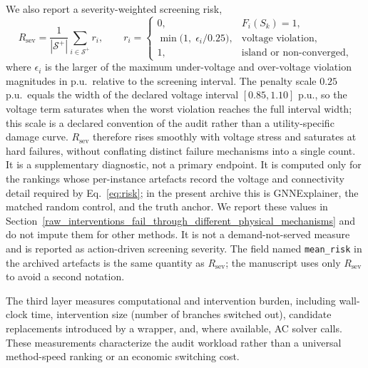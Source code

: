 We also report a severity-weighted screening risk,
\begin{equation}
R_{\mathrm{sev}}=\frac{1}{|\mathcal{S}^{+}|}\sum_{i\in\mathcal{S}^{+}} r_i,\qquad
r_i=\begin{cases}0,&F_i(S_k)=1,\\
\min\!\bigl(1,\;\epsilon_i/0.25\bigr),&\text{voltage violation,}\\
1,&\text{island or non-converged,}\end{cases}
\label{eq:risk}
\end{equation}
where $\epsilon_i$ is the larger of the maximum under-voltage and over-voltage violation magnitudes in p.u.\ relative to the screening interval. The penalty scale $0.25$ p.u.\ equals the width of the declared voltage interval $[0.85, 1.10]$ p.u., so the voltage term saturates when the worst violation reaches the full interval width; this scale is a declared convention of the audit rather than a utility-specific damage curve. $R_{\mathrm{sev}}$ therefore rises smoothly with voltage stress and saturates at hard failures, without conflating distinct failure mechanisms into a single count. It is a supplementary diagnostic, not a primary endpoint. It is computed only for the rankings whose per-instance artefacts record the voltage and connectivity detail required by Eq.~\eqref{eq:risk}; in the present archive this is GNNExplainer, the matched random control, and the truth anchor. We report these values in Section~\ref{raw_interventions_fail_through_different_physical_mechanisms} and do not impute them for other methods. It is not a demand-not-served measure and is reported as action-driven screening severity. The field named \texttt{mean\_risk} in the archived artefacts is the same quantity as $R_{\mathrm{sev}}$; the manuscript uses only $R_{\mathrm{sev}}$ to avoid a second notation.

The third layer measures computational and intervention burden, including wall-clock time, intervention size (number of branches switched out), candidate replacements introduced by a wrapper, and, where available, AC solver calls. These measurements characterize the audit workload rather than a universal method-speed ranking or an economic switching cost.


